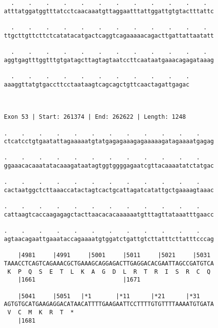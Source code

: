 \documentclass{article}
\begin{document}
\begin{Verbatim}
  .    .    .    .    .    .    .    .    .    .    .    .  
atttatggatggtttatcctcaacaaatgttaggaatttattggattgtgtactttattc
                                                            
  .    .    .    .    .    .    .    .    .    .    .    .  
ttgcttgttcttctcatatacatgactcaggtcagaaaaacagacttgattattaatatt
                                                            
  .    .    .    .    .    .    .    .    .    .    .    .  
aggtgagtttggtttgtgatagcttagtagtaatccttcaataatgaaacagagataaag
                                                            
  .    .    .    .    .    .    .    .    .    .    .
aaaggttatgtgaccttcctaataagtcagcagctgttcaactagattgagac
                                                     
                                                     
 
Exon 53 | Start: 261374 | End: 262622 | Length: 1248
 
.    .    .    .    .    .    .    .    .    .    .    .    
ctcatcctgtgaatattagaaaaatgtatgagagaaagagaaaaagatagaaaatgagag
                                                            
.    .    .    .    .    .    .    .    .    .    .    .    
ggaaacacaaatatacaaagataatagtggtggggagaatcgttacaaaatatctatgac
                                                            
.    .    .    .    .    .    .    .    .    .    .    .    
cactaatggctcttaaaccatactagtcactgcattagatcatattgctgaaaagtaaac
                                                            
.    .    .    .    .    .    .    .    .    .    .    .    
cattaagtcaccaagagagctacttaacacacaaaaaatgtttagttataaatttgaacc
                                                            
.    .    .    .    .    .    .    .    .    .    .    .    
agtaacagaattgaaataccagaaaatgtggatctgattgtcttatttcttatttcccag
                                                            
    |4981     |4991     |5001     |5011     |5021     |5031 
TAAACCTCAGTCAGAAACGCTGAAAGCAGGAGACTTGAGGACACGAATTAGCCGATGTCA
 K  P  Q  S  E  T  L  K  A  G  D  L  R  T  R  I  S  R  C  Q 
    |1661                         |1671                     
  
    |5041     |5051   |*1       |*11      |*21      |*31    
AGTGTGCATGAAGAGGACATAACATTTTGAAGAATTCCTTTTGTGTTTTAAAATGTGATA
 V  C  M  K  R  T  *   
    |1681                                                   
  

\end{Verbatim}
\end{document}
